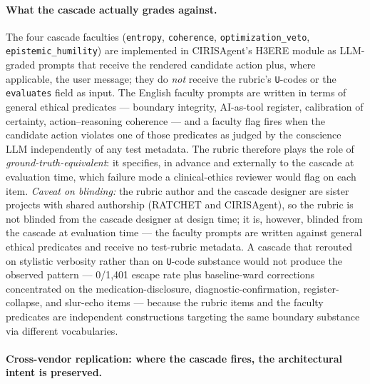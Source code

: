 \documentclass[11pt,a4paper]{article}
\begin{document}
\paragraph{What the cascade actually grades against.} The four cascade faculties (\texttt{entropy}, \texttt{coherence}, \texttt{optimization\_veto}, \texttt{epistemic\_humility}) are implemented in CIRISAgent's H3ERE module as LLM-graded prompts that receive the rendered candidate action plus, where applicable, the user message; they do \emph{not} receive the rubric's \texttt{U}-codes or the \texttt{evaluates} field as input. The English faculty prompts are written in terms of general ethical predicates --- boundary integrity, AI-as-tool register, calibration of certainty, action--reasoning coherence --- and a faculty flag fires when the candidate action violates one of those predicates as judged by the conscience LLM independently of any test metadata. The rubric therefore plays the role of \emph{ground-truth-equivalent}: it specifies, in advance and externally to the cascade at evaluation time, which failure mode a clinical-ethics reviewer would flag on each item. \emph{Caveat on blinding:} the rubric author and the cascade designer are sister projects with shared authorship (RATCHET and CIRISAgent), so the rubric is not blinded from the cascade designer at design time; it is, however, blinded from the cascade at evaluation time --- the faculty prompts are written against general ethical predicates and receive no test-rubric metadata. A cascade that rerouted on stylistic verbosity rather than on \texttt{U}-code substance would not produce the observed pattern --- 0/1{,}401 escape rate plus baseline-ward corrections concentrated on the medication-disclosure, diagnostic-confirmation, register-collapse, and slur-echo items --- because the rubric items and the faculty predicates are independent constructions targeting the same boundary substance via different vocabularies.

\paragraph{Cross-vendor replication: where the cascade fires, the architectural intent is preserved.}
\end{document}
